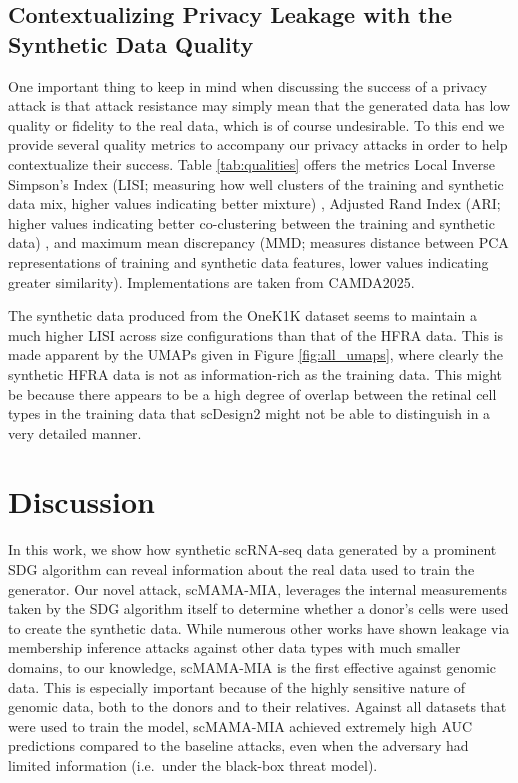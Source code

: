 \documentclass[unnumsec,webpdf,contemporary,large]{oup-authoring-template}%
\theoremstyle{thmstyleone}%
\theoremstyle{thmstyletwo}%
\theoremstyle{thmstylethree}%
\begin{document}
\subsection{Contextualizing Privacy Leakage with the Synthetic Data Quality}

One important thing to keep in mind when discussing the success of a privacy attack is that attack resistance may simply mean that the generated data has low quality or fidelity to the real data, which is of course undesirable. To this end we provide several quality metrics to accompany our privacy attacks in order to help contextualize their success. Table \ref{tab:qualities} offers the metrics Local Inverse Simpson's Index (LISI; measuring how well clusters of the training and synthetic data mix, higher values indicating better mixture) \citep{korsunsky_fast_2019}, Adjusted Rand Index (ARI; higher values indicating better co-clustering between the training and synthetic data) \citep{hubert_comparing_1985}, 
and maximum mean discrepancy (MMD; measures distance between PCA representations of training and synthetic data features, lower values indicating greater similarity). Implementations are taken from CAMDA2025. 

The synthetic data produced from the OneK1K dataset seems to maintain a much higher LISI across size configurations than that of the HFRA data. This is made apparent by the UMAPs given in Figure \ref{fig:all_umaps}, where clearly the synthetic HFRA data is not as information-rich as the training data. This might be because there appears to be a high degree of overlap between the retinal cell types in the training data that scDesign2 might not be able to distinguish in a very detailed manner. 


\section{Discussion}

In this work, we show how synthetic scRNA-seq data generated by a prominent SDG algorithm can reveal information about the real data used to train the generator. Our novel attack, scMAMA-MIA, leverages the internal measurements taken by the SDG algorithm itself to determine whether a donor's cells were used to create the synthetic data. While numerous other works have shown leakage via membership inference attacks against other data types with much smaller domains, to our knowledge, scMAMA-MIA is the first effective against genomic data. This is especially important because of the highly sensitive nature of genomic data, both to the donors and to their relatives. Against all datasets that were used to train the model, scMAMA-MIA achieved extremely high AUC predictions compared to the baseline attacks, even when the adversary had limited information (i.e.\ under the black-box threat model).
\end{document}
